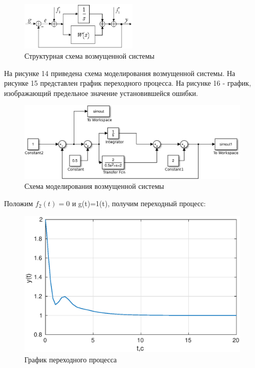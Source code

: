 \documentclass[12pt,a4paper]{article}
\begin{document}
\begin{figure}[H]
\centering
\includegraphics[width=0.5\textwidth]{1/444.eps}
\caption{Структурная схема возмущенной системы}
\end{figure}

На рисунке 14 приведена схема моделирования возмущенной системы.
На рисунке 15 представлен график переходного процесса. На рисунке 16 - график, изображающий предельное значение установившейся ошибки.
\begin{figure}[H]
\centering
\includegraphics[width=\textwidth]{1/3.eps}
\caption{Схема моделирования возмущенной системы}
\end{figure}


Положим $f_{2}(t)=0$ и g(t)=1(t), получим переходный процесс:

\begin{figure}[H]
\centering
\includegraphics[width=\textwidth]{1/3_2y(t).eps}
\caption{График переходного процесса}
\end{figure}
\end{document}
